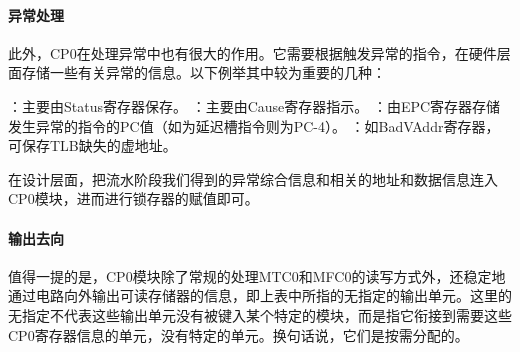         \paragraph{异常处理}
        此外，CP0在处理异常中也有很大的作用。它需要根据触发异常的指令，在硬件层面存储一些有关异常的信息。以下例举其中较为重要的几种：
        \begin{enumerate}
            ：主要由Status寄存器保存。
            ：主要由Cause寄存器指示。
            ：由EPC寄存器存储发生异常的指令的PC值（如为延迟槽指令则为PC-4）。
            ：如BadVAddr寄存器，可保存TLB缺失的虚地址。
        \end{enumerate}

        在设计层面，把流水阶段我们得到的异常综合信息和相关的地址和数据信息连入CP0模块，进而进行锁存器的赋值即可。

        \paragraph{输出去向}
        值得一提的是，CP0模块除了常规的处理MTC0和MFC0的读写方式外，还稳定地通过电路向外输出可读存储器的信息，即上表中所指的无指定的输出单元。这里的无指定不代表这些输出单元没有被键入某个特定的模块，而是指它衔接到需要这些CP0寄存器信息的单元，没有特定的单元。换句话说，它们是按需分配的。
